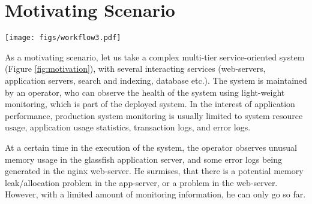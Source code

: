 \section{Motivating Scenario}
\label{sec:motivation}

\begin{figure*}[ht!]
  \begin{center}
    \texttt{[image: figs/workflow3.pdf]}
    \caption{Workflow of \parikshan in a live multi-tier production system with several interacting services. When the administrator of the system observes errors in two of it's tiers, he can create a sandboxed clone of these tiers and observe/debug them in a sandbox environment without impacting the actual production system.}
    \label{fig:motivation}
  \end{center}
\end{figure*}

\noindent
As a motivating scenario, let us take a complex multi-tier service-oriented system (Figure \ref{fig:motivation}), with several interacting services (web-servers, application servers, search and indexing, database etc.). 
The system is maintained by an operator, who can observe the health of the system using light-weight monitoring, which is part of the deployed system.
In the interest of application performance, production system monitoring is usually limited to system resource usage, application usage statistics, transaction logs, and error logs.

At a certain time in the execution of the system, the operator observes unusual memory usage in the glassfish application server, and some error logs being generated in the nginx web-server. 
He surmises, that there is a potential memory leak/allocation problem in the app-server, or a problem in the web-server.
However, with a limited amount of monitoring information, he can only go so far.

\iffalse
user Joe who is an administrator for a multi-tiered system (see Figure \ref{fig:motivation}). 
Much like several administrators, Joe uses light-weight system instrumentation to get a high level statistical/health view of the system.
He observes an unusually high memory usage in the glassfish server for transaction type X, and some anomalous error logs in the associated nginx systems.
Under usual circumstances, the system would have to go down(depending on the severity of the problem), the problem debugged using offline analysis, and the system would be patched once the problem has been diagnosed. 
However often, it is difficult to find out the configuration of the system, and the user input which is causing this problem.
In modern large scale systems some errors may happen only at scale, and would require a large test-cluster to recreate the error.
Furthermore, taking down the glassfish and nginx servers would impact several more services otherwise are running fine. 
\fi

